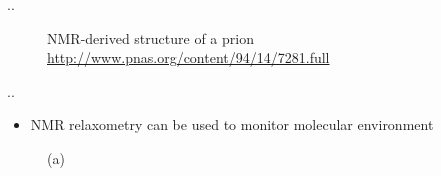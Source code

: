\documentclass[handout]{beamer}
\begin{document}
\begin{frame}{\thesection.\thesubsection. \insertsubsection}
\begin{figure}[ht]
\begin{minipage}[t]{0.45\linewidth}
				\caption{NMR-derived structure of a prion  \url{http://www.pnas.org/content/94/14/7281.full}}
				\label{fig3}
			\end{minipage}					
		\end{figure}
	\end{frame}
	
	
	\begin{frame}{\thesection.\thesubsection. \insertsubsection}
		\begin{itemize}
			\item NMR relaxometry can be used to monitor molecular environment
		\end{itemize}

		\begin{figure}[ht]
					
						
			\begin{minipage}[t]{0.15\textwidth}
				\centering
				(a)

\end{minipage}
\end{figure}
\end{frame}
\end{document}
